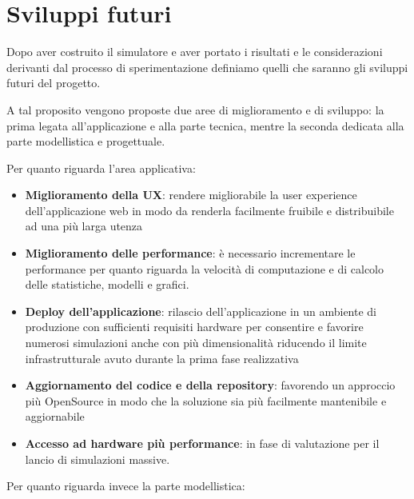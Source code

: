 \section{Sviluppi futuri}

    Dopo aver costruito il simulatore e aver portato i risultati e le considerazioni derivanti dal processo di sperimentazione definiamo quelli che saranno gli sviluppi futuri del progetto.
    
    A tal proposito vengono proposte due aree di miglioramento e di sviluppo: la prima legata all'applicazione e alla parte tecnica, mentre la seconda dedicata alla parte modellistica e progettuale.
    
    Per quanto riguarda l'area applicativa:
    \begin{itemize}
        \item \textbf{Miglioramento della UX}: rendere migliorabile la user experience dell'applicazione web in modo da renderla facilmente fruibile e distribuibile ad una più larga utenza
        \item \textbf{Miglioramento delle performance}:  è necessario incrementare le performance per quanto riguarda la velocità di computazione e di calcolo delle statistiche, modelli e grafici.
        \item \textbf{Deploy dell'applicazione}: rilascio dell'applicazione in un ambiente di produzione con sufficienti requisiti hardware per consentire e favorire numerosi simulazioni anche con più dimensionalità riducendo il limite infrastrutturale avuto durante la prima fase realizzativa
        \item \textbf{Aggiornamento del codice e della repository}: favorendo un approccio più OpenSource in modo che la soluzione sia più facilmente mantenibile e aggiornabile
        \item \textbf{Accesso ad hardware più performance}: in fase di valutazione per il lancio di simulazioni massive.
    \end{itemize}
    
    Per quanto riguarda invece la parte modellistica:
    
